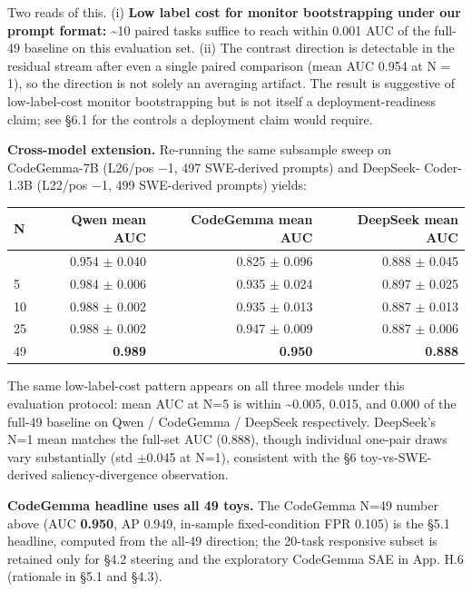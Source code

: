 \documentclass[
  11pt,
  a4paper]{article}
\newcounter{none} %
\begin{document}
Two reads of this. (i) \textbf{Low label cost for monitor bootstrapping
under our prompt format:} \textasciitilde10 paired tasks suffice to
reach within 0.001 AUC of the full-49 baseline on this evaluation set.
(ii) The contrast direction is detectable in the residual stream after
even a single paired comparison (mean AUC 0.954 at N = 1), so the
direction is not solely an averaging artifact. The result is suggestive
of low-label-cost monitor bootstrapping but is not itself a
deployment-readiness claim; see \S{}6.1 for the controls a deployment claim
would require.

\textbf{Cross-model extension.} Re-running the same subsample sweep on
CodeGemma-7B (L26/pos \ensuremath{-}1, 497 SWE-derived prompts) and DeepSeek-
Coder-1.3B (L22/pos \ensuremath{-}1, 499 SWE-derived prompts) yields:

{\def\LTcaptype{none} %
\begin{longtable}[]{@{}lrrr@{}}
\toprule\noalign{}
N & Qwen mean AUC & CodeGemma mean AUC & DeepSeek mean AUC \\
\midrule\noalign{}
\endhead
\bottomrule\noalign{}
\endlastfoot
1 & 0.954 \ensuremath{\pm} 0.040 & 0.825 \ensuremath{\pm} 0.096 & 0.888 \ensuremath{\pm} 0.045 \\
5 & 0.984 \ensuremath{\pm} 0.006 & 0.935 \ensuremath{\pm} 0.024 & 0.897 \ensuremath{\pm} 0.025 \\
10 & 0.988 \ensuremath{\pm} 0.002 & 0.935 \ensuremath{\pm} 0.013 & 0.887 \ensuremath{\pm} 0.013 \\
25 & 0.988 \ensuremath{\pm} 0.002 & 0.947 \ensuremath{\pm} 0.009 & 0.887 \ensuremath{\pm} 0.006 \\
49 & \textbf{0.989} & \textbf{0.950} & \textbf{0.888} \\
\end{longtable}
}

The same low-label-cost pattern appears on all three models under this
evaluation protocol: mean AUC at N=5 is within \textasciitilde0.005,
0.015, and 0.000 of the full-49 baseline on Qwen / CodeGemma / DeepSeek
respectively. DeepSeek's N=1 mean matches the full-set AUC (0.888),
though individual one-pair draws vary substantially (std \ensuremath{\pm}0.045 at N=1),
consistent with the \S{}6 toy-vs-SWE-derived saliency-divergence
observation.

\textbf{CodeGemma headline uses all 49 toys.} The CodeGemma N=49 number
above (AUC \textbf{0.950}, AP 0.949, in-sample fixed-condition FPR
0.105) is the \S{}5.1 headline, computed from the all-49 direction; the
20-task responsive subset is retained only for \S{}4.2 steering and the
exploratory CodeGemma SAE in App. H.6 (rationale in \S{}5.1 and \S{}4.3).
\end{document}
